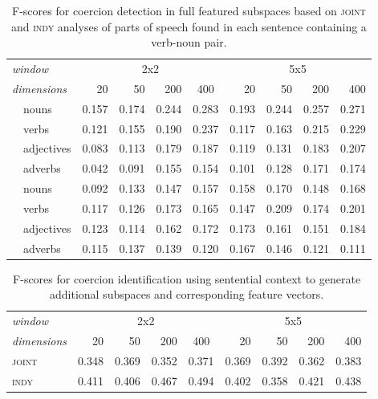 \begin{table}
\centering
\begin{tabular}{llrrrr|rrrr}
\hline
\multicolumn{2}{l}{\emph{window}} & \multicolumn{4}{c}{2x2} & \multicolumn{4}{c}{5x5} \\
\multicolumn{2}{l}{\emph{dimensions}} & 20 & 50 & 200 & \multicolumn{1}{c}{400} & 20 & 50 & 200 & 400 \\
\hline
\parbox[t]{2mm}{} & nouns & 0.157 & 0.174 & 0.244 & 0.283 & 0.193 & 0.244 & 0.257 & 0.271 \\
& verbs & 0.121 & 0.155 & 0.190 & 0.237 & 0.117 & 0.163 & 0.215 & 0.229 \\
& adjectives & 0.083 & 0.113 & 0.179 & 0.187 & 0.119 & 0.131 & 0.183 & 0.207 \\
& adverbs & 0.042 & 0.091 & 0.155 & 0.154 & 0.101 & 0.128 & 0.171 & 0.174 \\
\hline
\parbox[t]{2mm}{} & nouns & 0.092 & 0.133 & 0.147 & 0.157 & 0.158 & 0.170 & 0.148 & 0.168 \\
& verbs & 0.117 & 0.126 & 0.173 & 0.165 & 0.147 & 0.209 & 0.174 & 0.201 \\
& adjectives & 0.123 & 0.114 & 0.162 & 0.172 & 0.173 & 0.161 & 0.151 & 0.184 \\
& adverbs & 0.115 & 0.137 & 0.139 & 0.120 & 0.167 & 0.146 & 0.121 & 0.111 \\
\hline
\end{tabular}
\caption[Correlations for Part-of-Speech Based Subspaces]{F-scores for coercion detection in full featured subspaces based on \textsc{joint} and \textsc{indy} analyses of parts of speech found in each sentence containing a verb-noun pair.}
\end{table}

\begin{table}
\centering
\begin{tabular}{lrrrr|rrrr}
\hline
\emph{window} & \multicolumn{4}{c}{2x2} & \multicolumn{4}{c}{5x5} \\
\emph{dimensions} & 20 & 50 & 200 & \multicolumn{1}{c}{400} & 20 & 50 & 200 & 400 \\
\hline
\textsc{joint} & 0.348 & 0.369 & 0.352 & 0.371 & 0.369 & 0.392 & 0.362 & 0.383 \\
\textsc{indy} & 0.411 & 0.406 & 0.467 & 0.494 & 0.402 & 0.358 & 0.421 & 0.438 \\
\hline
\end{tabular}
\caption[F-Scores for Coercion Classification Using Full Sentences]{F-scores for coercion identification using sentential context to generate additional subspaces and corresponding feature vectors.}
\label{tab:full-coercion}
\end{table}

